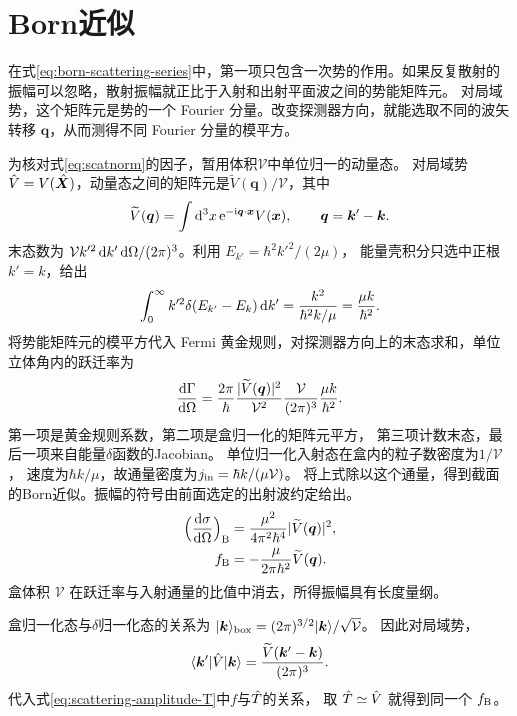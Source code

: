 \section{Born近似}
在式\eqref{eq:born-scattering-series}中，第一项只包含一次势的作用。如果反复散射的振幅可以忽略，散射振幅就正比于入射和出射平面波之间的势能矩阵元。
对局域势，这个矩阵元是势的一个 Fourier 分量。改变探测器方向，就能选取不同的波矢转移 $\bm q$，从而测得不同 Fourier 分量的模平方。

为核对式\eqref{eq:scatnorm}的因子，暂用体积$\mathcal V$中单位归一的动量态。
对局域势 $\hat{V} = V(\hat{\bm{X}})$，动量态之间的矩阵元是$\widetilde V(\bm q)/\mathcal V$，其中
\begin{equation}
    \widetilde V(\bm q) = \int\mathop{}\!\mathrm{d}^3x\mathop{}\!\mathrm{e}^{-\mathrm{i}\bm q\cdot\bm x}V(\bm x),\qquad
    \bm q = \bm k' - \bm k.
\end{equation}
末态数为 $\mathcal V k'^2\mathop{}\!\mathrm{d} k'\mathop{}\!\mathrm{d}\Omega/(2\pi)^3$。利用 $E_{k'} = \hbar^2 k'^2/(2\mu)$，
能量壳积分只选中正根 $k' = k$，给出
\[
    \int_0^\infty k'^2\delta(E_{k'} - E_k)\mathop{}\!\mathrm{d} k'
    = \frac{k^2}{\hbar^2 k/\mu} = \frac{\mu k}{\hbar^2}.
\]
将势能矩阵元的模平方代入 Fermi 黄金规则，对探测器方向上的末态求和，单位立体角内的跃迁率为
\begin{equation}
    \frac{\mathop{}\!\mathrm{d}\Gamma}{\mathrm{d}\Omega}
    = \frac{2\pi}{\hbar}
        \frac{\lvert\widetilde V(\bm q)\rvert^2}{\mathcal V^2}
        \frac{\mathcal V}{(2\pi)^3}
        \frac{\mu k}{\hbar^2}.
\end{equation}
第一项是黄金规则系数，第二项是盒归一化的矩阵元平方，
第三项计数末态，最后一项来自能量$\delta$函数的Jacobian。
单位归一化入射态在盒内的粒子数密度为$1/\mathcal V$，
速度为$\hbar k/\mu$，故通量密度为$j_{\mathrm{in}} = \hbar k/(\mu\mathcal V)$。
将上式除以这个通量，得到截面的Born近似。振幅的符号由前面选定的出射波约定给出。
\begin{subequations}
    \begin{align}
        \Bigl(\frac{\mathop{}\!\mathrm{d}\sigma}{\mathrm{d}\Omega}\Bigr)_{\mathrm{B}}
        &= \frac{\mu^2}{4\pi^2\hbar^4}\lvert\widetilde V(\bm q)\rvert^2,\\
        f_{\mathrm{B}} &= -\frac\mu{2\pi\hbar^2}\widetilde V(\bm q).
    \end{align}
\end{subequations}
盒体积 $\mathcal V$ 在跃迁率与入射通量的比值中消去，所得振幅具有长度量纲。

盒归一化态与$\delta$归一化态的关系为
$\lvert\bm k\rangle_{\mathrm{box}} = (2\pi)^{3/2}\lvert\bm k\rangle/\sqrt{\mathcal V}$。
因此对局域势，
\begin{equation}
    \langle\bm k'\vert\hat{V}\vert\bm k\rangle = \frac{\widetilde V(\bm k' - \bm k)}{(2\pi)^3}.
\end{equation}
代入式\eqref{eq:scattering-amplitude-T}中$f$与$\hat{T}$的关系，
取 $\hat{T} \simeq \hat{V}$ 就得到同一个 $f_{\mathrm{B}}$。

